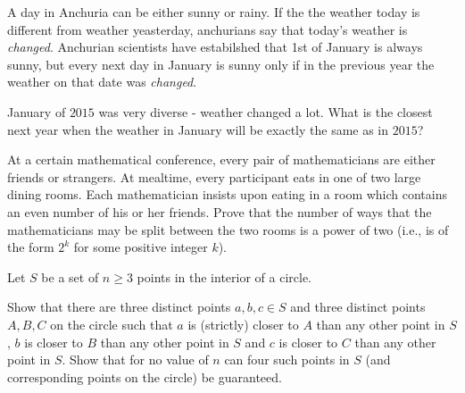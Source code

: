 

%



\renewcommand{\theenumi}{\alph{enumi}}



\noindent
 
\filbreak


\begin{problem}

A day in Anchuria can be either sunny or rainy. If the the weather today is different from weather yeasterday, anchurians say that today's weather is \textit{changed}. Anchurian scientists have estabilshed that 1st of January is always sunny, but every next day in January is sunny only if in the previous year the weather on that date was \textit{changed}. 

January of $2015$ was very diverse - weather changed a lot. What is the closest next year when the weather in January will be exactly the same as in $2015$?

\end{problem}

\begin{problem}

At a certain mathematical conference, every pair of mathematicians are either friends or strangers. At mealtime, every participant eats in one of two large dining rooms. Each mathematician insists upon eating in a room which contains an even number of his or her friends. Prove that the number of ways that the mathematicians may be split between the two rooms is a power of two (i.e., is of the form $2^k$ for some positive integer $k$).


\end{problem}



\begin{problem}


Let $S$ be a set of $n\ge 3$ points in the interior of a circle.

Show that there are three distinct points $a,b,c\in S$ and three distinct points $A,B,C$ on the circle such that $a$ is (strictly) closer to $A$ than any other point in $S$, $b$ is closer to $B$ than any other point in $S$ and $c$ is closer to $C$ than any other point in $S$.
Show that for no value of $n$ can four such points in $S$ (and corresponding points on the circle) be guaranteed.
\end{problem}




%

